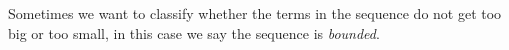 \documentclass{ximera}
\begin{document}
%

Sometimes we want to classify whether the terms in the sequence do not get too big or too
small, in this case we say the sequence is \textit{bounded}.
\end{document}

